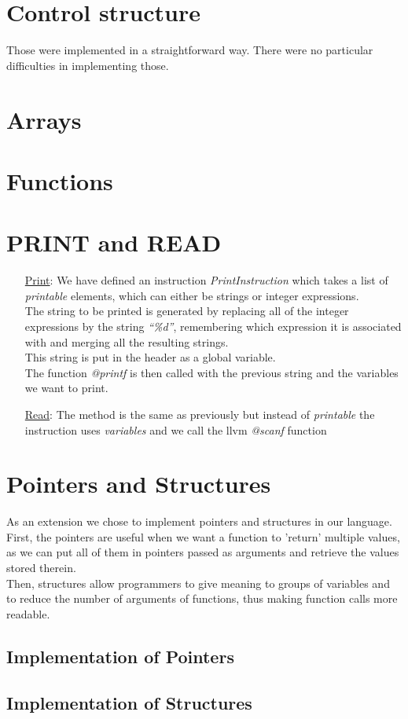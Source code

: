 \documentclass{article}
\begin{document}
\section{Control structure}

Those were implemented in a straightforward way. There were no particular difficulties in implementing those.

\section{Arrays}

\TODO

\section{Functions}

\TODO

\section{PRINT and READ}

\begin{itemize}
\item[\underline{Print}:] We have defined an instruction \emph{PrintInstruction}
  which takes a list of \emph{printable} elements, which can either be strings or integer expressions. \\
  The string to be printed is generated by replacing all of the integer expressions by the
  string \emph{``\%d''}, remembering which expression it is associated with and merging all the resulting strings. \\
  This string is put in the header as a global variable. \\
  The function \emph{@printf} is then called with the previous string and the variables we want to print. 
\item[\underline{Read}:] The method is the same as previously but instead of
  \emph{printable} the instruction uses \emph{variables} and we call the llvm \emph{@scanf} function
\end{itemize}

\section{Pointers and Structures}
As an extension we chose to implement pointers and structures in our language. First, the pointers are useful
when we want a function to 'return' multiple values, as we can put all of them in pointers passed as arguments and retrieve the values stored therein.\\
Then, structures allow programmers to give meaning to groups of variables and to reduce the number of arguments of functions, thus making function calls more readable. 

\subsection{Implementation of Pointers}
\subsection{Implementation of Structures}
\end{document}
